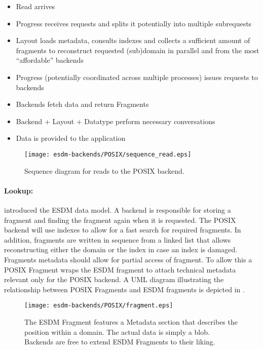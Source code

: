 \begin{itemize}
	\item Read arrives
	\item Progress receives requests and splits it potentially into multiple subrequests
	\item Layout loads metadata, consults indexes and collects a sufficient amount of fragments to reconstruct requested (sub)domain in parallel and from the most ``affordable'' backends
	\item Progress (potentially coordinated across multiple processes) issues requests to backends
	\item Backends fetch data and return Fragments
	\item Backend + Layout + Datatype perform necessary conversations
	\item Data is provided to the application
\end{itemize}



\begin{figure}
	\centering
	\texttt{[image: esdm-backends/POSIX/sequence\_read.eps]}
	\caption{Sequence diagram for reads to the POSIX backend.}
	\label{fig:backend posix sequence read}
\end{figure}



\paragraph{Lookup:}

 introduced the ESDM data model.
A backend is responsible for storing a fragment and finding the fragment again when it is requested.
The POSIX backend will use indexes to allow for a fast search for required fragments.
In addition, fragments are written in sequence from a linked list that allows reconstructing either the domain or the index in case an index is damaged.
Fragments metadata should allow for partial access of fragment.
To allow this a POSIX Fragment wraps the ESDM fragment to attach technical metadata relevant only for the POSIX backend.
A UML diagram illustrating the relationship between POSIX Fragments and ESDM fragments is depicted in .

\begin{figure}
	\centering
	\texttt{[image: esdm-backends/POSIX/fragment.eps]}
	\caption{The ESDM Fragment features a Metadata section that describes the position within a domain. The actual data is simply a blob. Backends are free to extend ESDM Fragments to their liking.}
	\label{fig:backend posix fragment}
\end{figure}





